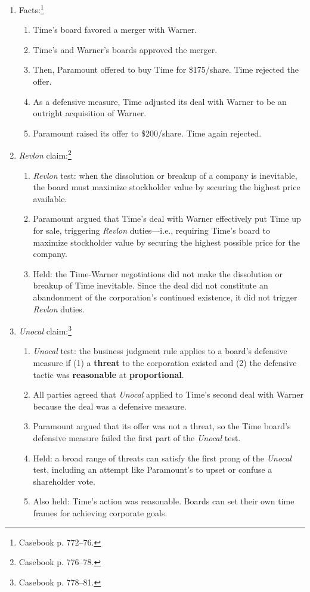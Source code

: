\begin{enumerate}
    \item Facts:\footnote{Casebook p. 772--76.}
    \begin{enumerate}
        \item Time's board favored a merger with Warner.
        \item Time's and Warner's boards approved the merger.
        \item Then, Paramount offered to buy Time for \$175/share. Time rejected 
        the offer.
        \item As a defensive measure, Time adjusted its deal with Warner to be 
        an outright acquisition of Warner.
        \item Paramount raised its offer to \$200/share. Time again rejected.
    \end{enumerate}
    \item \emph{Revlon} claim:\footnote{Casebook p. 776--78.}
    \begin{enumerate}
        \item \emph{Revlon} test: when the dissolution or breakup of a company 
        is inevitable, the board must maximize stockholder value by securing the 
        highest price available.
        \item Paramount argued that Time's deal with Warner effectively put Time 
        up for sale, triggering \emph{Revlon} duties---i.e., requiring Time's 
        board to maximize stockholder value by securing the highest possible 
        price for the company.
        \item Held: the Time-Warner negotiations did not make the dissolution or 
        breakup of Time inevitable. Since the deal did not constitute an 
        abandonment of the corporation's continued existence, it did not trigger 
        \emph{Revlon} duties.
    \end{enumerate}
    \item \emph{Unocal} claim:\footnote{Casebook p. 778--81.}
    \begin{enumerate}
        \item \emph{Unocal} test: the business judgment rule applies to a 
        board's defensive measure if (1) a \textbf{threat} to the corporation 
        existed and (2) the defensive tactic was \textbf{reasonable} at 
        \textbf{proportional}.
        \item All parties agreed that \emph{Unocal} applied to Time's second 
        deal with Warner because the deal was a defensive measure.
        \item Paramount argued that its offer was not a threat, so the Time 
        board's defensive measure failed the first part of the \emph{Unocal} 
        test.
        \item Held: a broad range of threats can satisfy the first prong of the 
        \emph{Unocal} test, including an attempt like Paramount's to upset or 
        confuse a shareholder vote.
        \item Also held: Time's action was reasonable. Boards can set their own 
        time frames for achieving corporate goals.
    \end{enumerate}
\end{enumerate}

